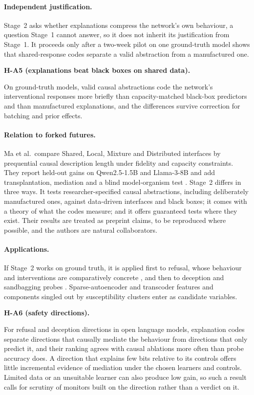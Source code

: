 \documentclass[11pt,a4paper]{article}
\newenvironment{hypbox}[1]{%
  \def\FrameCommand{{\color{chyp}\vrule width 1.6pt}\hspace{8pt}}%
  \MakeFramed{\advance\hsize-\width\FrameRestore}%
  \noindent\textbf{#1}\par\smallskip\noindent\ignorespaces}{\endMakeFramed}
\begin{document}
\paragraph{Independent justification.} Stage~2 asks whether explanations
compress the network's own behaviour, a question Stage~1 cannot answer, so
it does not inherit its justification from Stage~1. It proceeds only after
a two-week pilot on one ground-truth model shows that shared-response codes
separate a valid abstraction from a manufactured one.

\begin{hypbox}{H-A5 (explanations beat black boxes on shared data).}
On ground-truth models, valid causal abstractions code the network's
interventional responses more briefly than capacity-matched black-box
predictors and than manufactured explanations, and the differences survive
correction for batching and prior effects.
\end{hypbox}

\paragraph{Relation to forked futures.} Ma et al.\ compare Shared, Local,
Mixture and Distributed interfaces by prequential causal description length
under fidelity and capacity constraints. They report held-out gains on
Qwen2.5-1.5B and Llama-3-8B and add transplantation, mediation and a blind
model-organism test \cite{ma2026}. Stage~2 differs in three ways. It tests
researcher-specified causal abstractions, including deliberately
manufactured ones, against data-driven interfaces and black boxes; it
comes with a theory of what the codes measure; and it offers guaranteed
tests where they exist. Their results are treated as preprint claims, to be
reproduced where possible, and the authors are natural collaborators.

\paragraph{Applications.} If Stage~2 works on ground truth, it is applied
first to refusal, whose behaviour and interventions are comparatively
concrete \cite{arditi2024}, and then to deception and sandbagging probes
\cite{goldowskydill2025}. Sparse-autoencoder and transcoder features
\cite{mib2025} and components singled out by susceptibility clusters
\cite{baker2026,gordon2026} enter as candidate variables.

\begin{hypbox}{H-A6 (safety directions).}
For refusal and deception directions in open language models, explanation
codes separate directions that causally mediate the behaviour from
directions that only predict it, and their ranking agrees with causal
ablations more often than probe accuracy does. A direction that explains few bits relative to its controls offers little incremental evidence of mediation under the chosen learners and controls. Limited data or an unsuitable learner can also produce low gain, so such a result calls for scrutiny of monitors built on the direction rather than a verdict on it.
\end{hypbox}
\end{document}
